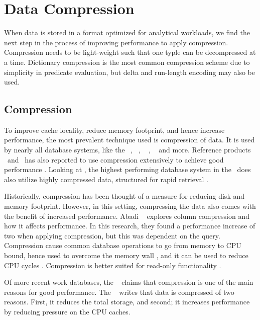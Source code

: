 \chapter{Data Compression}
\label{chap:Data Compression}
When data is stored in a format optimized for analytical workloads, we find the next step in the process of improving performance to apply compression. Compression needs to be light-weight such that one typle can be decompressed at a time. Dictionary compression is the most common compression scheme due to simplicity in predicate evaluation, but delta and run-length encoding may also be used.
\newpage

\section{Compression}
\label{sec:Compression}
To improve cache locality, reduce memory footprint, and hence increase performance, the most prevalent technique used is compression of data. It is used by nearly all database systems, like the \ibm~\cite{Raman2013-em}, \cstore~\cite{Stonebraker2005-qz}, ~ \cite{Lamb2012-kg}, \oracle~\cite{Oracle2015-fs} and more. Reference products \tableau~and \qlikview~has also reported to use compression extensively to achieve good performance \cite{Kamkolkar2015-iq, Qlik2014-vd}. Looking at \exasol, the highest performing database system in the \tpch~does also utilize highly compressed data, structured for rapid retrieval \cite{Exasol2014-xh}.

Historically, compression has been thought of a measure for reducing disk and memory footprint. However, in this setting, compressing the data also comes with the benefit of increased performance. Abadi \ea~\cite{Abadi2008-dd} explores column compression and how it affects performance. In this research, they found a performance increase of two when applying compression, but this was dependent on the query. Compression cause common database operations to go from memory to CPU bound, hence used to overcome the memory wall \cite{Willhalm2009-hu}, and it can be used to reduce CPU cycles \cite{Stonebraker2005-qz}. Compression is better suited for read-only functionality \cite{Westmann2000-mz}.

Of more recent work databases, the \gorilla~\cite{Pelkonen2015-ko} claims that compression is one of the main reasons for good performance. The \exasol~\cite{Exasol2014-xh} writes that data is compressed of two reasons. First, it reduces the total storage, and second; it increases performance by reducing pressure on the CPU caches.

